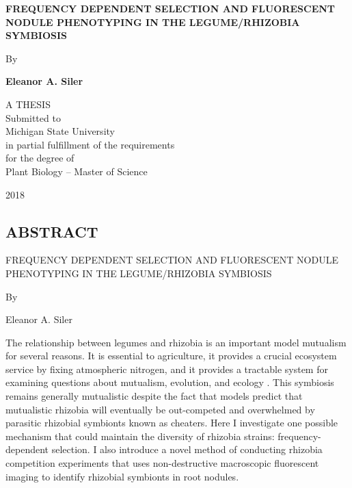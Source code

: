 \documentclass[12pt]{article}
\begin{document}
	
	\begin{titlepage}
		\begin{center}
			\vspace*{0.84375in}
			
			
			\textbf{\large{FREQUENCY DEPENDENT SELECTION AND FLUORESCENT NODULE PHENOTYPING IN THE LEGUME/RHIZOBIA SYMBIOSIS}}
			
			\vspace*{12pt}
			
			By
			
			\vspace{12pt}
			
			\textbf{Eleanor A. Siler}
			
			\vfill
			
			A THESIS\\
			\vspace{12pt}
			Submitted to\\
			Michigan State University\\
			in partial fulfillment of the requirements\\
			for the degree of\\
			\vspace{12pt}
			Plant Biology -- Master of Science
			
			\vspace{12pt}
			
			
			2018
		\end{center}
	\end{titlepage}
	\newpage
	\begin{center}	%
	\section*{\large{ABSTRACT}}
	FREQUENCY DEPENDENT SELECTION AND FLUORESCENT NODULE PHENOTYPING IN THE LEGUME/RHIZOBIA SYMBIOSIS
	\begin{center}
	By
	\end{center}
	Eleanor A. Siler
	\end{center}
	\vspace{-.35cm}
	\begin{doublespace} 
	The relationship between legumes and rhizobia is an important model mutualism for several reasons. It is essential to agriculture, it provides a crucial ecosystem service by fixing atmospheric nitrogen, and it provides a tractable system for examining questions about mutualism, evolution, and ecology \cite{Vance2002,Gruber2008}. This symbiosis remains generally mutualistic despite the fact that models predict that mutualistic rhizobia will eventually be out-competed and overwhelmed by parasitic rhizobial symbionts known as cheaters. Here I investigate one possible mechanism that could maintain the diversity of rhizobia strains: frequency-dependent selection. I also introduce a novel method of conducting rhizobia competition experiments that uses non-destructive macroscopic fluorescent imaging to identify rhizobial symbionts in root nodules. 
	\end{doublespace}
	\newpage
\end{document}
